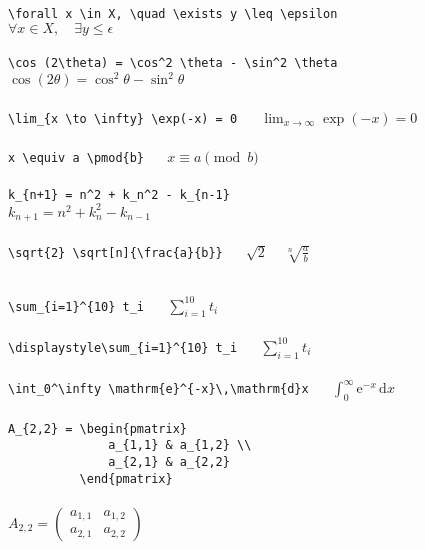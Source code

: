 \begin{frame}[fragile]\transfade\centering
  \verb!\forall x \in X, \quad \exists y \leq \epsilon!\\$\forall x \in X, \quad \exists y \leq \epsilon$\\~\\
  \verb!\cos (2\theta) = \cos^2 \theta - \sin^2 \theta!\\$\cos (2\theta) = \cos^2 \theta - \sin^2 \theta$\\~\\
  \verb!\lim_{x \to \infty} \exp(-x) = 0! ~~ $
  \lim_{x \to \infty} \exp(-x) = 0$\\~\\
  \verb!x \equiv a \pmod{b}! ~~ $x \equiv a \pmod{b}$\\~\\
  \verb!k_{n+1} = n^2 + k_n^2 - k_{n-1}!\\$k_{n+1} = n^2 + k_n^2 - k_{n-1}$\\~\\
  \verb!\sqrt{2} \sqrt[n]{\frac{a}{b}}! ~~ $\sqrt2$ ~ $\sqrt[n]{\frac{a}{b}}$\\~
\end{frame}
\begin{frame}[fragile]\transfade\centering
  \verb!\sum_{i=1}^{10} t_i! ~~ $\sum_{i=1}^{10} t_i$\\~\\
  \verb!\displaystyle\sum_{i=1}^{10} t_i! ~~ $\displaystyle\sum_{i=1}^{10} t_i$\\~\\
  \verb!\int_0^\infty \mathrm{e}^{-x}\,\mathrm{d}x! ~~ $\int_0^\infty \mathrm{e}^{-x}\,\mathrm{d}x$\\~\\
  \verb!A_{2,2} = \begin{pmatrix}         !\\
  \verb!              a_{1,1} & a_{1,2} \\!\\
  \verb!              a_{2,1} & a_{2,2}   !\\
  \verb!          \end{pmatrix}           !\\~\\
    $A_{2,2} = \begin{pmatrix}a_{1,1} & a_{1,2} \\a_{2,1} & a_{2,2}\end{pmatrix}$\\~
\end{frame}

